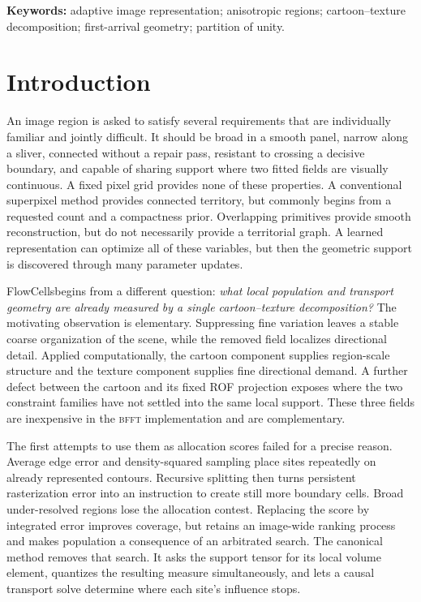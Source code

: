 \documentclass[11pt,letterpaper]{article}
\newcommand{\BFFT}{\textsc{bfft}}
\newcommand{\method}{FlowCells}
\begin{document}
\noindent\textbf{Keywords:} adaptive image representation; anisotropic regions;
cartoon--texture decomposition; first-arrival geometry; partition of unity.

\section{Introduction}
\label{sec:introduction}

An image region is asked to satisfy several requirements that are individually familiar
and jointly difficult. It should be broad in a smooth panel, narrow along a sliver,
connected without a repair pass, resistant to crossing a decisive boundary, and capable
of sharing support where two fitted fields are visually continuous. A fixed pixel grid
provides none of these properties. A conventional superpixel method provides connected
territory, but commonly begins from a requested count and a compactness prior.
Overlapping primitives provide smooth reconstruction, but do not necessarily provide a
territorial graph. A learned representation can optimize all of these variables, but
then the geometric support is discovered through many parameter updates.

\method begins from a different question: \emph{what local population and transport
geometry are already measured by a single cartoon--texture decomposition?} The
motivating observation is elementary. Suppressing fine variation leaves a stable
coarse organization of the scene, while the removed field localizes directional detail.
Applied computationally, the cartoon component supplies region-scale structure and the
texture component supplies fine directional demand. A further defect between the
cartoon and its fixed ROF projection exposes where the two constraint families have not
settled into the same local support. These three fields are inexpensive in the
\BFFT{} implementation and are complementary.

The first attempts to use them as allocation scores failed for a precise reason.
Average edge error and density-squared sampling place sites repeatedly on already
represented contours. Recursive splitting then turns persistent rasterization error into
an instruction to create still more boundary cells. Broad under-resolved regions lose
the allocation contest. Replacing the score by integrated error improves coverage, but
retains an image-wide ranking process and makes population a consequence of an
arbitrated search. The canonical method removes that search. It asks the support tensor
for its local volume element, quantizes the resulting measure simultaneously, and lets
a causal transport solve determine where each site's influence stops.
\end{document}
